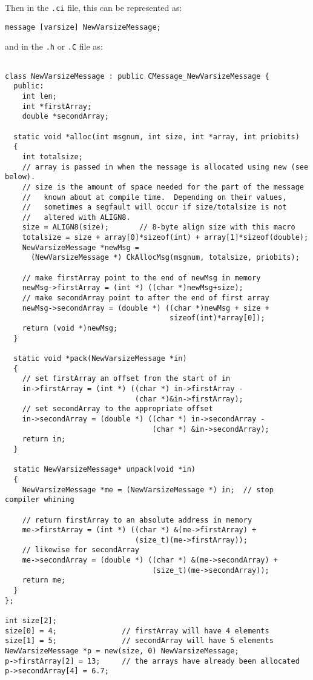 Then in the {\tt .ci} file, this can be represented as: 

\begin{verbatim}
message [varsize] NewVarsizeMessage;
\end{verbatim}

and in the {\tt .h} or {\tt .C} file as:

\begin{verbatim} 

class NewVarsizeMessage : public CMessage_NewVarsizeMessage { 
  public: 
    int len; 
    int *firstArray; 
    double *secondArray; 

  static void *alloc(int msgnum, int size, int *array, int priobits) 
  { 
    int totalsize; 
    // array is passed in when the message is allocated using new (see below).
    // size is the amount of space needed for the part of the message  
    //   known about at compile time.  Depending on their values, 
    //   sometimes a segfault will occur if size/totalsize is not 
    //   altered with ALIGN8. 
    size = ALIGN8(size);       // 8-byte align size with this macro 
    totalsize = size + array[0]*sizeof(int) + array[1]*sizeof(double); 
    NewVarsizeMessage *newMsg = 
      (NewVarsizeMessage *) CkAllocMsg(msgnum, totalsize, priobits); 

    // make firstArray point to the end of newMsg in memory  
    newMsg->firstArray = (int *) ((char *)newMsg+size); 
    // make secondArray point to after the end of first array  
    newMsg->secondArray = (double *) ((char *)newMsg + size + 
                                      sizeof(int)*array[0]); 
    return (void *)newMsg; 
  } 

  static void *pack(NewVarsizeMessage *in) 
  {
    // set firstArray an offset from the start of in 
    in->firstArray = (int *) ((char *) in->firstArray - 
                              (char *)&in->firstArray); 
    // set secondArray to the appropriate offset 
    in->secondArray = (double *) ((char *) in->secondArray - 
                                  (char *) &in->secondArray); 
    return in; 
  } 

  static NewVarsizeMessage* unpack(void *in) 
  { 
    NewVarsizeMessage *me = (NewVarsizeMessage *) in;  // stop compiler whining
 
    // return firstArray to an absolute address in memory
    me->firstArray = (int *) ((char *) &(me->firstArray) + 
                              (size_t)(me->firstArray)); 
    // likewise for secondArray
    me->secondArray = (double *) ((char *) &(me->secondArray) + 
                                  (size_t)(me->secondArray)); 
    return me;
  } 
}; 

int size[2];
size[0] = 4;               // firstArray will have 4 elements
size[1] = 5;               // secondArray will have 5 elements 
NewVarsizeMessage *p = new(size, 0) NewVarsizeMessage;
p->firstArray[2] = 13;     // the arrays have already been allocated 
p->secondArray[4] = 6.7; 



\end{verbatim}

